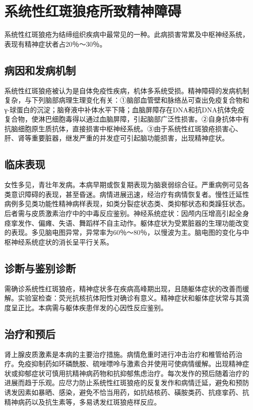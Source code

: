 \section{系统性红斑狼疮所致精神障碍}

系统性红斑狼疮为结缔组织疾病中最常见的一种。此病损害常累及中枢神经系统，表现有精神症状者占20％～30％。

\subsection{病因和发病机制}

系统性红斑狼疮被认为是自体免疫性疾病，机体多系统受损。精神障碍的发病机制复杂，与下列脑部病理生理变化有关：①脑部血管壁和脉络丛可查出免疫复合物和γ-球蛋白的沉淀；脑脊液中补体水平下降；血脑屏障存在DNA和抗DNA抗体免疫复合物，使淋巴细胞毒得以通过血脑屏障，引起脑部广泛性损害。②自身抗体中有抗脑细胞原生质抗体，直接损害中枢神经系统。③由于系统性红斑狼疮损害心、肝、肾等重要脏器，继发严重的并发症可引起脑功能损害，出现精神症状。

\subsection{临床表现}

女性多见，青壮年发病。本病早期或恢复期表现为脑衰弱综合征。严重病例可见各类意识障碍的表现，甚至昏迷。病情进展迅速，经治疗有病情恢复者。慢性迁延性病例多见类功能性精神病样表现，如类分裂症状态类、类抑郁状态和类躁狂状态。后者需与皮质激素治疗中的中毒反应鉴别。神经系统症状：因颅内压增高引起全身痉挛发作、偏瘫、失语、舞蹈样不自主动作。躯体症状为受累脏器的生理功能改变的表现。多见脑电图异常，异常率为60％～80％，以慢波为主。脑电图的变化与中枢神经系统症状的消长呈平行关系。

\subsection{诊断与鉴别诊断}

需确诊系统性红斑狼疮，精神症状多在疾病高峰期出现，且随躯体症状的改善而缓解。实验室检查：荧光抗核抗体阳性对确诊有意义。精神症状和躯体症状常与其滴度呈正比。本病需与躯体疾患伴发的心因性反应鉴别。

\subsection{治疗和预后}

肾上腺皮质激素是本病的主要治疗措施。病情危重时进行冲击治疗和椎管给药治疗。免疫抑制药如环磷酰胺、硫唑嘌呤与激素合并使用可使病情缓解。出现精神症状或抑郁症状可慎用抗精神病药物和抗抑郁焦虑治疗。每次发作的预后随着治疗的进展而趋于乐观。应尽力防止系统性红斑狼疮的反复发作和病情迁延，避免和预防诱发因素如暴晒、感染，避免不恰当用药，如抗结核药、磺胺类药、抗痉挛药、抗精神病药以及抗生素等，多易诱发红斑狼疮样反应。
